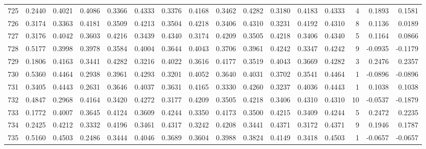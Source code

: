\begin{tabular}{lrrrrrrrrrrrrrrr}
725 &      0.2440 &  0.4021 &  0.4086 &  0.3366 &  0.4333 &  0.3376 &  0.4168 &  0.3462 &  0.4282 &  0.3180 &   0.4183 &     0.4333 &      4 &                    0.1893 &                     0.1581 \\
726 &      0.3174 &  0.3363 &  0.4181 &  0.3509 &  0.4213 &  0.3504 &  0.4218 &  0.3406 &  0.4310 &  0.3231 &   0.4192 &     0.4310 &      8 &                    0.1136 &                     0.0189 \\
727 &      0.3176 &  0.4042 &  0.3603 &  0.4216 &  0.3439 &  0.4340 &  0.3174 &  0.4209 &  0.3505 &  0.4218 &   0.3406 &     0.4340 &      5 &                    0.1164 &                     0.0866 \\
728 &      0.5177 &  0.3998 &  0.3978 &  0.3584 &  0.4004 &  0.3644 &  0.4043 &  0.3706 &  0.3961 &  0.4242 &   0.3347 &     0.4242 &      9 &                   -0.0935 &                    -0.1179 \\
729 &      0.1806 &  0.4163 &  0.3441 &  0.4282 &  0.3216 &  0.4022 &  0.3616 &  0.4177 &  0.3519 &  0.4043 &   0.3669 &     0.4282 &      3 &                    0.2476 &                     0.2357 \\
730 &      0.5360 &  0.4464 &  0.2938 &  0.3961 &  0.4293 &  0.3201 &  0.4052 &  0.3640 &  0.4031 &  0.3702 &   0.3541 &     0.4464 &      1 &                   -0.0896 &                    -0.0896 \\
731 &      0.3405 &  0.4443 &  0.2631 &  0.3646 &  0.4037 &  0.3631 &  0.4165 &  0.3330 &  0.4260 &  0.3237 &   0.4036 &     0.4443 &      1 &                    0.1038 &                     0.1038 \\
732 &      0.4847 &  0.2968 &  0.4164 &  0.3420 &  0.4272 &  0.3177 &  0.4209 &  0.3505 &  0.4218 &  0.3406 &   0.4310 &     0.4310 &     10 &                   -0.0537 &                    -0.1879 \\
733 &      0.1772 &  0.4007 &  0.3645 &  0.4124 &  0.3609 &  0.4244 &  0.3350 &  0.4173 &  0.3500 &  0.4215 &   0.3409 &     0.4244 &      5 &                    0.2472 &                     0.2235 \\
734 &      0.2425 &  0.4212 &  0.3332 &  0.4196 &  0.3461 &  0.4317 &  0.3242 &  0.4208 &  0.3441 &  0.4371 &   0.3172 &     0.4371 &      9 &                    0.1946 &                     0.1787 \\
735 &      0.5160 &  0.4503 &  0.2486 &  0.3444 &  0.4046 &  0.3689 &  0.3604 &  0.3988 &  0.3824 &  0.4149 &   0.3418 &     0.4503 &      1 &                   -0.0657 &                    -0.0657 \\

\end{tabular}
